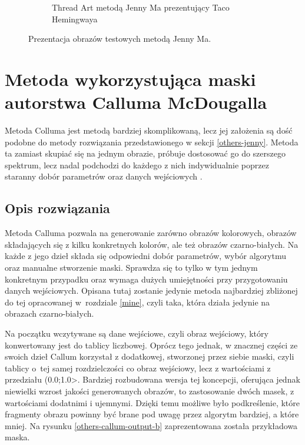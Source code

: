 \begin{figure}[htb]
\begin{subfigure}{0.24\textwidth}
            \caption{Thread Art metodą Jenny Ma prezentujący Taco Hemingwaya}
            \label{others-jenny-output-d}
        \end{subfigure}
        \caption{Prezentacja obrazów testowych metodą Jenny Ma.}
        \label{others-jenny-output}
        \end{figure}
            
    \section{Metoda wykorzystująca maski autorstwa Calluma McDougalla} \label{others-callum}
    Metoda Colluma jest metodą bardziej skomplikowaną, lecz jej założenia są dość podobne do metody rozwiązania przedstawionego w sekcji \ref{others-jenny}. Metoda ta zamiast skupiać się na jednym obrazie, próbuje dostosować go do szerszego spektrum, lecz nadal podchodzi do każdego z nich indywidualnie poprzez staranny dobór parametrów oraz danych wejściowych \cite{callum-github}.
        \subsection{Opis rozwiązania}
        Metoda Calluma pozwala na generowanie zarówno obrazów kolorowych, obrazów składających się z kilku konkretnych kolorów, ale też obrazów czarno-białych. Na każde z jego dzieł składa się odpowiedni dobór parametrów, wybór algorytmu oraz manualne stworzenie maski. Sprawdza się to tylko w tym jednym konkretnym przypadku oraz wymaga dużych umiejętności przy przygotowaniu danych wejściowych. Opisana tutaj zostanie jedynie metoda najbardziej zbliżonej do tej opracowanej w~rozdziale \ref{mine}, czyli taka, która działa jedynie na obrazach czarno-białych.
        
        Na początku wczytywane są dane wejściowe, czyli obraz wejściowy, który konwertowany jest do tablicy liczbowej. Oprócz tego jednak, w znacznej części ze swoich dzieł Callum korzystał z dodatkowej, stworzonej przez siebie maski, czyli tablicy o~tej samej rozdzielczości co obraz wejściowy, lecz z wartościami z przedziału (0.0;1.0>. Bardziej rozbudowana wersja tej koncepcji, oferująca jednak niewielki wzrost jakości generowanych obrazów, to zastosowanie dwóch masek, z wartościami dodatnimi i ujemnymi. Dzięki temu możliwe było podkreślenie, które fragmenty obrazu powinny być brane pod uwagę przez algorytm bardziej, a które mniej. Na rysunku \ref{others-callum-output-b} zaprezentowana została przykładowa maska.
        
